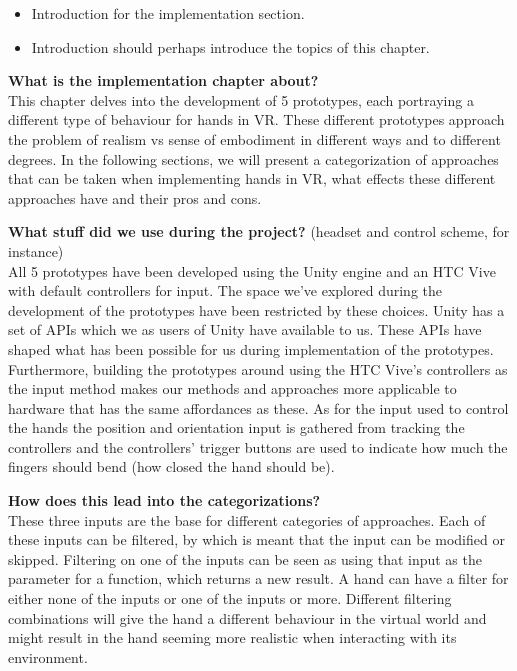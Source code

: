 \begin{itemize}
\item Introduction for the implementation section.
\item Introduction should perhaps introduce the topics of this chapter.
\end{itemize}

\textbf{What is the implementation chapter about?}\\
This chapter delves into the development of 5 prototypes, each portraying a different type of behaviour for hands in VR. These different prototypes approach the problem of realism vs sense of embodiment in different ways and to different degrees. In the following sections, we will present a categorization of approaches that can be taken when implementing hands in VR, what effects these different approaches have and their pros and cons.

\textbf{What stuff did we use during the project?} (headset and control scheme, for instance)\\
All 5 prototypes have been developed using the Unity engine and an HTC Vive with default controllers for input. The space we’ve explored during the development of the prototypes have been restricted by these choices. Unity has a set of APIs which we as users of Unity have available to us. These APIs have shaped what has been possible for us during implementation of the prototypes. Furthermore, building the prototypes around using the HTC Vive’s controllers as the input method makes our methods and approaches more applicable to hardware that has the same affordances as these. As for the input used to control the hands the position and orientation input is gathered from tracking the controllers and the controllers’ trigger buttons are used to indicate how much the fingers should bend (how closed the hand should be).

\textbf{How does this lead into the categorizations?}\\
These three inputs are the base for different categories of approaches. Each of these inputs can be filtered, by which is meant that the input can be modified or skipped. Filtering on one of the inputs can be seen as using that input as the parameter for a function, which returns a new result. A hand can have a filter for either none of the inputs or one of the inputs or more. Different filtering combinations will give the hand a different behaviour in the virtual world and might result in the hand seeming more realistic when interacting with its environment.

